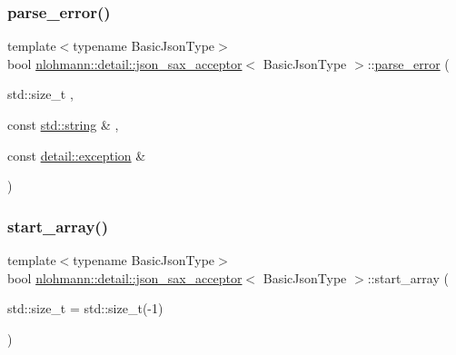 \subsubsection{\texorpdfstring{parse\_error()}{parse\_error()}}
{\footnotesize\ttfamily template$<$typename Basic\+Json\+Type$>$ \\
bool \mbox{\hyperlink{classnlohmann_1_1detail_1_1json__sax__acceptor}{nlohmann\+::detail\+::json\+\_\+sax\+\_\+acceptor}}$<$ Basic\+Json\+Type $>$\+::\mbox{\hyperlink{classnlohmann_1_1detail_1_1parse__error}{parse\+\_\+error}} (\begin{DoxyParamCaption}\item[{std\+::size\+\_\+t}]{,  }\item[{const \mbox{\hyperlink{namespacenlohmann_1_1detail_a1ed8fc6239da25abcaf681d30ace4985ab45cffe084dd3d20d928bee85e7b0f21}{std\+::string}} \&}]{,  }\item[{const \mbox{\hyperlink{classnlohmann_1_1detail_1_1exception}{detail\+::exception}} \&}]{ }\end{DoxyParamCaption})\hspace{0.3cm}{\ttfamily [inline]}}

\mbox{\label{classnlohmann_1_1detail_1_1json__sax__acceptor_a8238e8090cbb4ed8a22cbc97bfb833a5}} 
\subsubsection{\texorpdfstring{start\_array()}{start\_array()}}
{\footnotesize\ttfamily template$<$typename Basic\+Json\+Type$>$ \\
bool \mbox{\hyperlink{classnlohmann_1_1detail_1_1json__sax__acceptor}{nlohmann\+::detail\+::json\+\_\+sax\+\_\+acceptor}}$<$ Basic\+Json\+Type $>$\+::start\+\_\+array (\begin{DoxyParamCaption}\item[{std\+::size\+\_\+t}]{ = {\ttfamily std\+:\+:size\+\_\+t(-\/1)} }\end{DoxyParamCaption})\hspace{0.3cm}{\ttfamily [inline]}}

\mbox{\label{classnlohmann_1_1detail_1_1json__sax__acceptor_a822bbca11a9fea0aa337018e351755f5}} 
